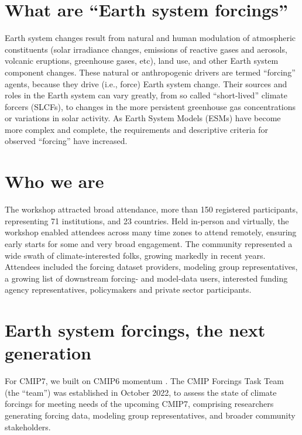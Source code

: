 \documentclass{ametsocV6.1}
\begin{document}

\section*{What are ``Earth system forcings''}
Earth system changes result from natural and human modulation of atmospheric constituents (solar irradiance changes, emissions of reactive gases and aerosols, volcanic eruptions, greenhouse gases, etc), land use, and other Earth system component changes. These natural or anthropogenic drivers are termed ``forcing'' agents, because they drive (i.e., force) Earth system change. Their sources and roles in the Earth system can vary greatly, from so called ``short-lived'' climate forcers (SLCFs), to changes in the more persistent greenhouse gas concentrations or variations in solar activity. As Earth System Models (ESMs) have become more complex and complete, the requirements and descriptive criteria for observed ``forcing'' have increased.

\section*{Who we are}
The workshop attracted broad attendance, more than 150 registered participants, representing 71 institutions, and 23 countries. Held in-person and virtually, the workshop enabled attendees across many time zones to attend remotely, ensuring early starts for some and very broad engagement. The community represented a wide swath of climate-interested folks, growing markedly in recent years. Attendees included the forcing dataset providers, modeling group representatives, a growing list of downstream forcing- and model-data users, interested funding agency representatives, policymakers and private sector participants.

\section*{Earth system forcings, the next generation}
For CMIP7, we built on CMIP6 momentum \citep{durack_toward_2018}. The CMIP Forcings Task Team (the ``team'') was established in October 2022, to assess the state of climate forcings for meeting needs of the upcoming CMIP7, comprising researchers generating forcing data, modeling group representatives, and broader community stakeholders.
\end{document}
